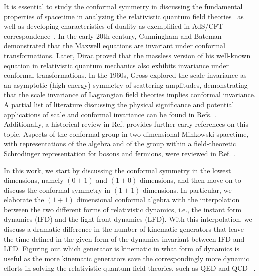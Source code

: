 \documentclass[%
 reprint,
superscriptaddress,
 amsmath,amssymb,
 aps,
]{revtex4-2}
\begin{document}
It is essential to study the conformal symmetry in discussing the fundamental properties of spacetime in analyzing the relativistic quantum field theories~\cite{Wess1960, Kastrup1966, SalamMack1969, Gross1970} as well as developing characteristics of duality as exemplified in AdS/CFT correspondence~\cite {Weinberg_2010, Brodsky_2015, Maldacena2016}. In the early 20th century, Cunningham  \cite{Cunningham1910} and Bateman  \cite{Bateman1910} demonstrated that the Maxwell equations are invariant under conformal transformations. Later, Dirac  \cite{Dirac1936} proved that the massless version of his well-known equation in relativistic quantum mechanics also exhibits invariance under conformal transformations. In the 1960s, Gross \cite{Gross1970} explored the scale invariance as an asymptotic (high-energy) symmetry of scattering amplitudes, demonstrating that the scale invariance of Lagrangian field theories implies conformal invariance. A partial list of literature discussing the physical significance and potential applications of scale and conformal invariance can be found in Refs. \cite{Wess1960, Gürsey1956, Fulton1962, Kastrup1966, SalamMack1969, Wilson1969, Gross1970}. Additionally, a historical review in Ref. \cite{Kastrup2008} provides further early references on this topic. Aspects of the conformal group in two-dimensional Minkowski spacetime, with representations of the algebra and of the group within a field-theoretic Schrodinger representation for bosons and fermions, were reviewed in Ref. \cite{Jackiw1990}.

In this work, we start by discussing the conformal symmetry in the lowest dimensions, namely $(0+1)$ and $(1+0)$ dimensions, and then move on to discuss the conformal symmetry in 
$(1+1)$ dimensions. In particular, we elaborate the $(1+1)$ dimensional conformal algebra with the interpolation between the two different forms of relativistic dynamics, i.e., the instant form dynamics (IFD) and the light-front dynamics (LFD). With this interpolation, we discuss a dramatic difference in the number of kinematic generators that leave the time defined in the given form of the dynamics invariant
between IFD and LFD. Figuring out which generator is kinematic in what form of dynamics is useful as the more kinematic generators save the correspondingly more dynamic efforts in solving the relativistic quantum field theories, such as QED and QCD~ \cite{ji2023relativistic}.
\end{document}
